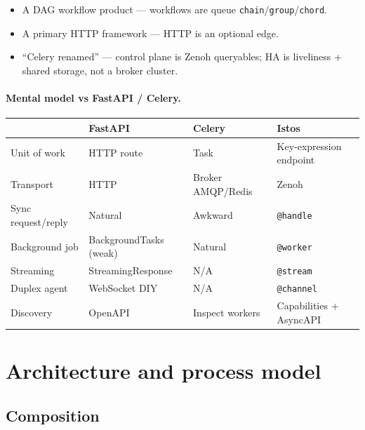\documentclass[11pt,a4paper]{article}
\begin{document}
\begin{warnbox}
\begin{itemize}[leftmargin=*,itemsep=1pt]
  \item A DAG workflow product --- workflows are queue \texttt{chain}/\texttt{group}/\texttt{chord}.
  \item A primary HTTP framework --- HTTP is an optional edge.
  \item ``Celery renamed'' --- control plane is Zenoh queryables; HA is liveliness
        + shared storage, not a broker cluster.
\end{itemize}
\end{warnbox}

\paragraph{Mental model vs FastAPI / Celery.}
\begin{center}
\begin{tabularx}{\textwidth}{@{}lXXX@{}}
\toprule
 & \textbf{FastAPI} & \textbf{Celery} & \textbf{Istos} \\
\midrule
Unit of work & HTTP route & Task & Key-expression endpoint \\
Transport & HTTP & Broker AMQP/Redis & Zenoh \\
Sync request/reply & Natural & Awkward & \texttt{@handle} \\
Background job & BackgroundTasks (weak) & Natural & \texttt{@worker} \\
Streaming & StreamingResponse & N/A & \texttt{@stream} \\
Duplex agent & WebSocket DIY & N/A & \texttt{@channel} \\
Discovery & OpenAPI & Inspect workers & Capabilities + AsyncAPI \\
\bottomrule
\end{tabularx}
\end{center}

\section{Architecture and process model}

\subsection{Composition}
\end{document}
